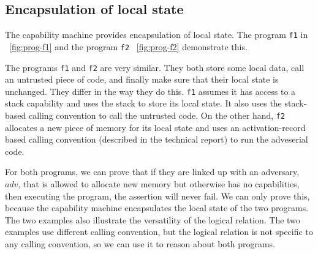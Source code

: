 \documentclass[compsoc,conference,letterpaper,fleqn]{IEEEtran}
\newcommand{\var}[1]{\mathit{#1}}
\newcommand{\adv}{\var{adv}}
\begin{document}
\subsection{Encapsulation of local state}
The capability machine provides encapsulation of local state. The
program \texttt{f1} in \figurename~\ref{fig:prog-f1} and the program
\texttt{f2} \figurename~\ref{fig:prog-f2} demonstrate this.
 
The programs \texttt{f1} and \texttt{f2} are very similar. They both
store some local data, call an untrusted piece of code, and finally
make sure that their local state is unchanged. They differ in the way
they do this. \texttt{f1} assumes it has access to a stack capability
and uses the stack to store its local state. It also uses the
stack-based calling convention to call the untrusted code. On the
other hand, \texttt{f2} allocates a new piece of memory for its local
state and uses an activation-record based calling convention
(described in the technical report) to run the adveserial code.

For both programs, we can prove that if they are linked up with an
adversary, $\adv$, that is allowed to allocate new memory but otherwise has no
capabilities, then executing the program, the assertion will never
fail.
We can only prove this, because the capability machine encapsulates
the local state of the two programs. The two examples also illustrate
the versatility of the logical relation. The two examples use
different calling convention, but the logical relation is not specific
to any calling convention, so we can use it to reason about both
programs.
\end{document}
